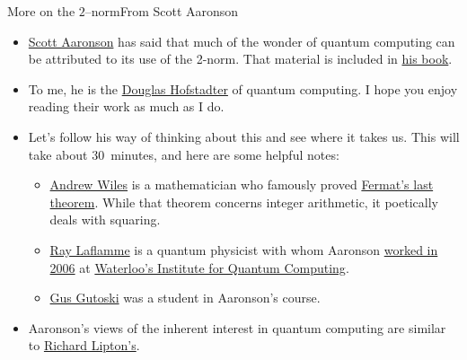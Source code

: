 \begin{frame}{More on the $2$--norm}{From Scott Aaronson}

\begin{itemize}
\item 
\href{https://scottaaronson.com/}{Scott Aaronson} has said that much of the wonder of quantum computing can be attributed to its use of the 2-norm.  That material is included in \href{https://www.amazon.com/Quantum-Computing-since-Democritus-Aaronson/dp/0521199565}{his book}.  

\item To me, he is the \href{https://en.wikipedia.org/wiki/Douglas_Hofstadter}{Douglas Hofstadter} of quantum computing.  I hope you enjoy reading their work as much as I do.
\item 
Let's follow his way of thinking about this  and see where it takes us.  This will take \alert{about 30~minutes}, and here are some helpful notes:
\begin{itemize}
    \item \href{https://en.wikipedia.org/wiki/Andrew_Wiles}{Andrew Wiles} is a mathematician who famously proved \href{https://en.wikipedia.org/wiki/Fermat\%27s_Last_Theorem}{Fermat's last theorem}. While that theorem concerns integer arithmetic, it poetically deals with squaring.
    \item \href{https://en.wikipedia.org/wiki/Raymond_Laflamme}{Ray Laflamme} is a quantum physicist with whom Aaronson \href{https://news.ycombinator.com/item?id=23621425}{worked in 2006} at \href{https://uwaterloo.ca/institute-for-quantum-computing/}{Waterloo's Institute for Quantum Computing}.
    \item \href{https://www.linkedin.com/in/ggutoski/}{Gus Gutoski} was a student in Aaronson's course.
\end{itemize}
\item Aaronson's views of the inherent interest in quantum computing are similar to \href{https://mitpress.mit.edu/contributors/richard-j-lipton}{Richard Lipton's}.
\end{itemize}

\end{frame}


